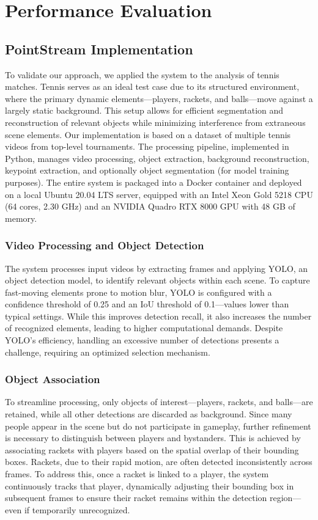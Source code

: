 \documentclass[sigconf, screen, review, anonymous]{acmart}
\begin{document}
\newpage
\section{Performance Evaluation}

\subsection{PointStream Implementation}
To validate our approach, we applied the system to the analysis of tennis matches. Tennis serves as an ideal test case due to its structured environment, where the primary dynamic elements—players, rackets, and balls—move against a largely static background. This setup allows for efficient segmentation and reconstruction of relevant objects while minimizing interference from extraneous scene elements.
Our implementation is based on a dataset of multiple tennis videos from top-level tournaments. The processing pipeline, implemented in Python, manages video processing, object extraction, background reconstruction, keypoint extraction, and optionally object segmentation (for model training purposes). The entire system is packaged into a Docker container and deployed on a local Ubuntu 20.04 LTS server, equipped with an Intel Xeon Gold 5218 CPU (64 cores, 2.30 GHz) and an NVIDIA Quadro RTX 8000 GPU with 48 GB of memory.

\subsubsection{Video Processing and Object Detection}
The system processes input videos by extracting frames and applying YOLO, an object detection model, to identify relevant objects within each scene. To capture fast-moving elements prone to motion blur, YOLO is configured with a confidence threshold of 0.25 and an IoU threshold of 0.1—values lower than typical settings. While this improves detection recall, it also increases the number of recognized elements, leading to higher computational demands. Despite YOLO’s efficiency, handling an excessive number of detections presents a challenge, requiring an optimized selection mechanism.

\subsubsection{Object Association}
To streamline processing, only objects of interest—players, rackets, and balls—are retained, while all other detections are discarded as background. Since many people appear in the scene but do not participate in gameplay, further refinement is necessary to distinguish between players and bystanders. This is achieved by associating rackets with players based on the spatial overlap of their bounding boxes.
Rackets, due to their rapid motion, are often detected inconsistently across frames. To address this, once a racket is linked to a player, the system continuously tracks that player, dynamically adjusting their bounding box in subsequent frames to ensure their racket remains within the detection region—even if temporarily unrecognized.
\end{document}
